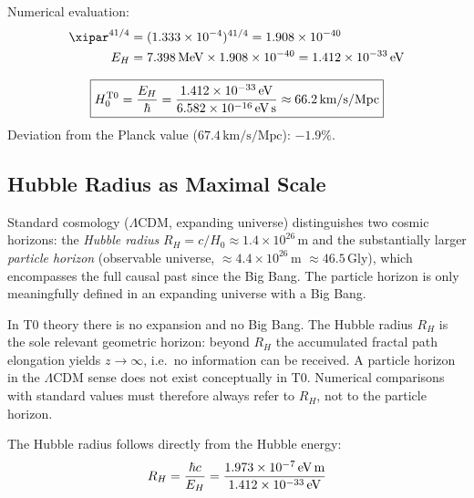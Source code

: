 Numerical evaluation:
\begin{align}
	\xipar^{41/4} &= (1{.}333 \times 10^{-4})^{41/4} = 1{.}908 \times 10^{-40} \\
	E_H &= 7{.}398\,\text{MeV} \times 1{.}908 \times 10^{-40} = 1{.}412 \times 10^{-33}\,\text{eV}
\end{align}

\begin{keyresult}
\begin{equation}
	\boxed{H_0^{\text{T0}} = \frac{E_H}{\hbar} = \frac{1{.}412 \times 10^{-33}\,\text{eV}}{6{.}582 \times 10^{-16}\,\text{eV\,s}} \approx 66{.}2\,\text{km/s/Mpc}}
\end{equation}
Deviation from the Planck value ($67{.}4\,\text{km/s/Mpc}$): $-1{.}9\%$.
\end{keyresult}

\subsection{Hubble Radius as Maximal Scale}

\begin{foundation}
Standard cosmology ($\Lambda$CDM, expanding universe) distinguishes two cosmic horizons: the \textit{Hubble radius} $R_H = c/H_0 \approx 1{.}4 \times 10^{26}$\,m and the substantially larger \textit{particle horizon} (observable universe, $\approx 4{.}4 \times 10^{26}$\,m $\approx 46.5$\,Gly), which encompasses the full causal past since the Big Bang. The particle horizon is only meaningfully defined in an expanding universe with a Big Bang.

In T0 theory there is no expansion and no Big Bang. The Hubble radius $R_H$ is the sole relevant geometric horizon: beyond $R_H$ the accumulated fractal path elongation yields $z \to \infty$, i.e.\ no information can be received. A particle horizon in the $\Lambda$CDM sense does not exist conceptually in T0. Numerical comparisons with standard values must therefore always refer to $R_H$, not to the particle horizon.
\end{foundation}

The Hubble radius follows directly from the Hubble energy:
\begin{equation}
	R_H = \frac{\hbar c}{E_H} = \frac{1{.}973 \times 10^{-7}\,\text{eV\,m}}{1{.}412 \times 10^{-33}\,\text{eV}}
\end{equation}

